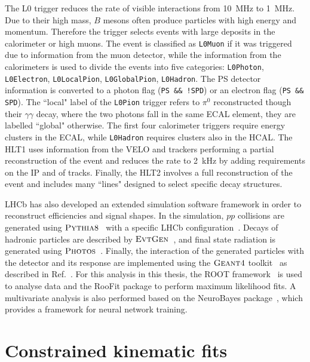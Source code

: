 The L0 trigger reduces the rate of visible interactions from 10~MHz to 1~MHz.
Due to their high mass, $B$ mesons often produce particles with high energy and momentum.
Therefore the trigger selects events with large deposits in the calorimeter
or high \pt muons. The event is classified as \verb!L0Muon! if it was triggered due to information
from the muon detector, while the information from the calorimeters is used to divide the
events into five categories: \verb!L0Photon!, \verb!L0Electron!, \verb!L0LocalPion!, 
\verb!L0GlobalPion!, \verb!L0Hadron!. The PS detector information is converted to a photon flag 
(\verb|PS && !SPD|) or an electron flag (\verb|PS && SPD|). The ``local" label of the \verb!L0Pion! trigger 
refers to $\pi^0$ reconstructed though their $\gamma\gamma$ decay, where the two photons fall in the 
same ECAL element, they are labelled ``global" otherwise. The first four calorimeter triggers require 
energy clusters in the ECAL, while \verb!L0Hadron! requires clusters also in the HCAL. 
The HLT1 uses information from the VELO and trackers performing a partial reconstruction 
of the event and reduces the rate to 2~kHz by adding requirements on the IP and \chisq of tracks.
Finally, the HLT2 involves a full reconstruction of the event and includes many ``lines" designed 
to select specific decay structures.

LHCb has also developed an extended simulation software framework in order to reconstruct efficiencies and signal shapes.
In the simulation, $pp$ collisions are generated using $\textsc{Pythia}8$~\cite{Sjostrand:2006za,Sjostrand:2007gs} with a specific
LHCb configuration~\cite{LHCb-PROC-2010-056}. Decays of hadronic particles are described by $\textsc{EvtGen}$~\cite{Lange:2001uf},
and final state radiation is generated using $\textsc{Photos}$~\cite{Golonka:2005pn}. Finally, the interaction of the generated
particles with the detector and its response are implemented using the $\textsc{Geant4}$ toolkit~\cite{Allison:2006ve}
as described in Ref.~\cite{LHCb-PROC-2011-006}. For this analysis in this thesis, the ROOT framework~\cite{Brun:2000es} is
used to analyse data and the RooFit package to perform maximum likelihood fits. A multivariate analysis is also performed
based on the NeuroBayes package~\cite{Feindt:2006pm,feindt-2004}, which provides a framework for neural network training.

\section{Constrained kinematic fits}
\label{sec:DTF}

